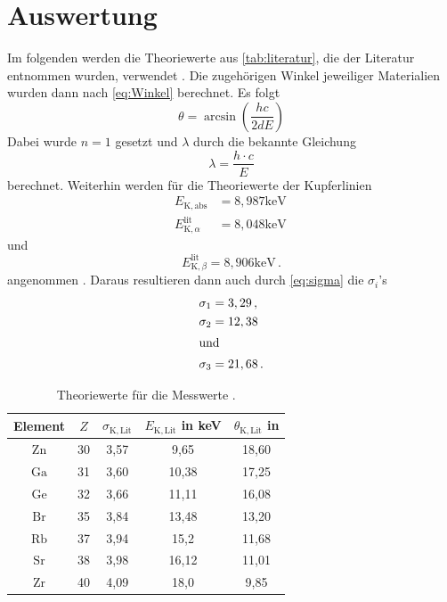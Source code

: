 \section{Auswertung}
\label{sec:Auswertung}


Im folgenden werden die Theoriewerte aus \autoref{tab:literatur}, die der Literatur entnommen wurden, verwendet \cite{x_ray_database}.
Die zugehörigen Winkel jeweiliger Materialien wurden dann nach \autoref{eq:Winkel} berechnet.
Es folgt 
\begin{equation*}
  \theta = \arcsin \left( \frac{h c}{2 d E} \right)
\end{equation*}
Dabei wurde $n = 1$ gesetzt und $\lambda$ durch die bekannte Gleichung 
\begin{equation*}
  \lambda = \frac{h \cdot c}{E}
\end{equation*}
berechnet.
Weiterhin werden für die Theoriewerte der Kupferlinien
\begin{align*}
  E_{\mathrm{K}, \mathrm{abs}} &=8,987 \mathrm{keV} \, \\
  E_{\mathrm{K}, \alpha}^{\mathrm{lit}} &=8,048 \mathrm{keV} 
\end{align*}
und
\begin{equation*}
  E_{\mathrm{K}, \beta}^{\mathrm{lit}} =8,906 \mathrm{keV} \, .
\end{equation*}
angenommen \cite{x_ray_database}.
Daraus resultieren dann auch durch \autoref{eq:sigma} die $\sigma_i$'s
\begin{align*}
  \sigma_{1} &=3,29 \, ,\\
  \sigma_{2} &=12,38 \\ 
  \intertext{und}
  \sigma_{3} &=21,68 \, .
\end{align*}
 
\begin{table}
  \centering
  \caption{Theoriewerte für die Messwerte \cite{x_ray_database}.}
  \label{tab:literatur}
  \begin{tabular}{ccccc} 
    \hline Element & $Z$ & $\sigma_{\mathrm{K, Lit}}$& $E_{\mathrm{K, Lit}}$ in keV & $\theta_{\mathrm{K, Lit}}$ in \\
    \hline $\mathrm{Zn}$ & 30 & 3,57 & 9,65 & 18,60  \\
    $\mathrm{Ga}$ & 31 & 3,60 & 10,38 & 17,25  \\
    $\mathrm{Ge}$ & 32 & 3,66 & 11,11 & 16,08  \\
    $\mathrm{Br}$ & 35 & 3,84 & 13,48 & 13,20  \\
    $\mathrm{Rb}$ & 37 & 3,94 & 15,2 & 11,68   \\
    $\mathrm{Sr}$ & 38 & 3,98 & 16,12 & 11,01  \\
    $\mathrm{Zr}$ & 40 & 4,09 & 18,0 & 9,85    \\
    \hline
  \end{tabular}
\end{table}

